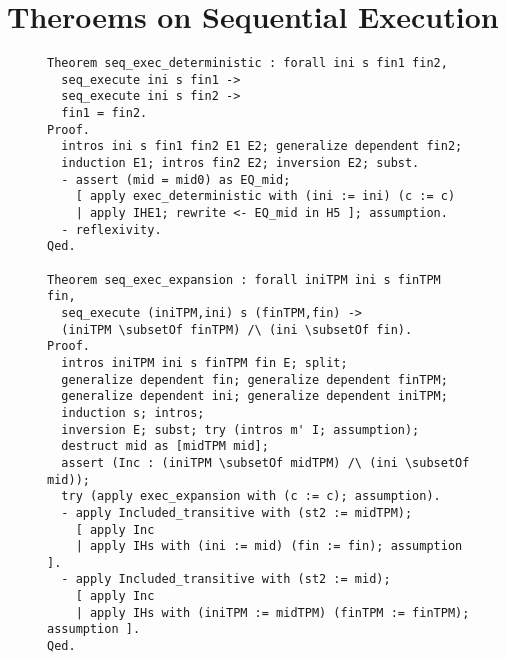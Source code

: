 \chapter{Theroems on Sequential Execution}


\begin{figure}[h]
\begin{lstlisting}[language=Coq]
Theorem seq_exec_deterministic : forall ini s fin1 fin2,
  seq_execute ini s fin1 ->
  seq_execute ini s fin2 ->
  fin1 = fin2.
Proof.
  intros ini s fin1 fin2 E1 E2; generalize dependent fin2;
  induction E1; intros fin2 E2; inversion E2; subst.
  - assert (mid = mid0) as EQ_mid;
    [ apply exec_deterministic with (ini := ini) (c := c)
    | apply IHE1; rewrite <- EQ_mid in H5 ]; assumption.
  - reflexivity.
Qed.

Theorem seq_exec_expansion : forall iniTPM ini s finTPM fin,
  seq_execute (iniTPM,ini) s (finTPM,fin) ->
  (iniTPM \subsetOf finTPM) /\ (ini \subsetOf fin).
Proof.
  intros iniTPM ini s finTPM fin E; split;
  generalize dependent fin; generalize dependent finTPM;
  generalize dependent ini; generalize dependent iniTPM;
  induction s; intros;
  inversion E; subst; try (intros m' I; assumption);
  destruct mid as [midTPM mid];
  assert (Inc : (iniTPM \subsetOf midTPM) /\ (ini \subsetOf mid)); 
  try (apply exec_expansion with (c := c); assumption).
  - apply Included_transitive with (st2 := midTPM);
    [ apply Inc
    | apply IHs with (ini := mid) (fin := fin); assumption ].
  - apply Included_transitive with (st2 := mid);
    [ apply Inc
    | apply IHs with (iniTPM := midTPM) (finTPM := finTPM); assumption ].
Qed.
\end{lstlisting}
\end{figure}

